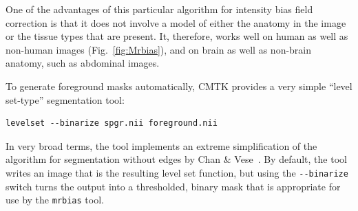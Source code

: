 \documentclass{InsightArticle}
\begin{document}
One of the advantages of this particular algorithm for intensity bias field
correction is that it does not involve a model of either the anatomy in the
image or the tissue types that are present. It, therefore, works well on human
as well as non-human images (Fig.~\ref{fig:Mrbias}), and on brain as well as
non-brain anatomy, such as abdominal images.

To generate foreground masks automatically, CMTK provides a very simple
``level set-type'' segmentation tool: 
\begin{verbatim}
levelset --binarize spgr.nii foreground.nii
\end{verbatim}
In very broad terms, the tool implements an extreme simplification of the
algorithm for segmentation without edges by Chan \&
Vese~\cite{ChanVese:2001}. By default, the tool writes an image that is the
resulting level set function, but using the \verb|--binarize| switch turns the
output into a thresholded, binary mask that is appropriate for use by the
\verb|mrbias| tool.
\end{document}
